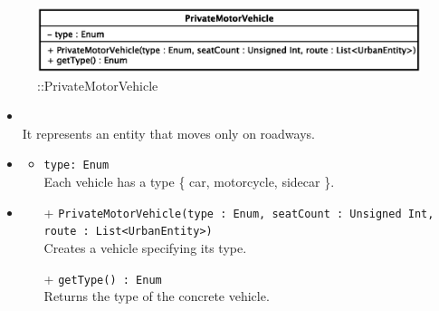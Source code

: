 \begin{figure}[h]
\centering
\includegraphics[scale=0.6,keepaspectratio]{images/solution/private_motor_vehicle.eps}
\caption{\pActive::PrivateMotorVehicle}
\label{fig:sd-app-private-motor-vehicle}
\end{figure}
\FloatBarrier
\begin{itemize}
  \item \textbf{\descr} \\
It represents an entity that moves only on roadways.
  \item \textbf{\attrs}
  \begin{itemize}
    \item \texttt{type: Enum} \\
Each vehicle has a type \{ car, motorcycle, sidecar \}.
  \end{itemize}
  \item \textbf{\ops}
  \begin{itemize}
  \item[+] \texttt{PrivateMotorVehicle(type : Enum, seatCount : Unsigned Int, route : List<UrbanEntity>)} \\
Creates a vehicle specifying its type.
    \item[+] \texttt{getType() : Enum} \\
Returns the type of the concrete vehicle.
  \end{itemize}
\end{itemize} 
